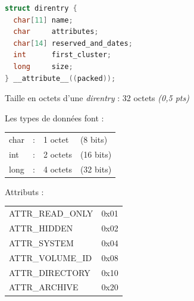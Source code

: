 \documentclass[11pt,a4paper]{article}
\begin{document}
\begin{table}[ht!]
  \centering
  \begin{minipage}{0.51\textwidth}
    \centering


\begin{lstlisting}[language=C]
struct direntry {
  char[11] name;
  char     attributes;
  char[14] reserved_and_dates;
  int      first_cluster;
  long     size;
} __attribute__((packed)); \end{lstlisting}

Taille en octets d'une \textit{direntry} : 32 octets \textit{(0,5 pts)}

  \end{minipage}
  \hfillx
  \begin{minipage}{0.39\textwidth}

Les types de données font :

\smallskip

\begin{tabular}{l l l l}
char & : & 1 octet  & (8 bits)  \\
int  & : & 2 octets & (16 bits) \\
long & : & 4 octets & (32 bits) \\
\end{tabular}


\medskip

Attributs :

\medskip

\begin{tabular}{l l}
ATTR\_READ\_ONLY & 0x01 \\
ATTR\_HIDDEN     & 0x02 \\
ATTR\_SYSTEM     & 0x04 \\
ATTR\_VOLUME\_ID & 0x08 \\
ATTR\_DIRECTORY  & 0x10 \\
ATTR\_ARCHIVE    & 0x20 \\
\end{tabular}

  \end{minipage}
\end{table}
\end{document}
